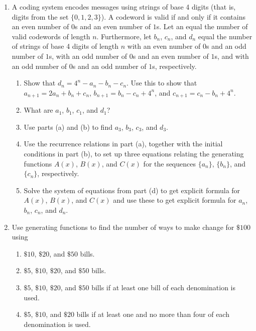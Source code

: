 \documentclass{../../cls/sig-alternate-05-2015}
\begin{document}
\begin{enumerate}
	\item A coding system encodes messages using strings of
	base 4 digits (that is, digits from the set $\{0, 1, 2, 3\}$). A codeword is valid if and only if it contains an even
	number of $0$s and an even number of $1$s. Let an equal the number of valid codewords of length $n$. Furthermore, let $b_n$, $c_n$, and $d_n$ equal the number of strings of base 4 digits of length $n$ with an even number of $0$s and an odd number of $1$s, with an odd number of $0$s and an even number of $1$s, and with an odd number of $0$s and an odd number of $1$s, respectively. \begin{enumerate}
		\item Show that $d_n = 4^n - a_n - b_n - c_n$. Use this to show that $a_{n+1} = 2a_n + b_n + c_n$, $b_{n+1} = b_n - c_n + 4^n$, and $c_{n+1} = c_n - b_n + 4^n$.
		\item What are $a_1$, $b_1$, $c_1$, and $d_1$?
		\item Use parts (a) and (b) to find $a_3$, $b_3$, $c_3$, and $d_3$.
		\item Use the recurrence relations in part (a), together with the initial conditions in part (b), to set up three equations relating the generating functions $A(x)$, $B(x)$, and $C(x)$ for the sequences $\{a_n\}$, $\{b_n\}$, and $\{c_n\}$, respectively.
		\item Solve the system of equations from part (d) to get explicit formula for $A(x)$, $B(x)$, and $C(x)$ and use these to get explicit formula for $a_n$, $b_n$, $c_n$, and $d_n$.
		

	\end{enumerate}
	
	\item Use generating functions to find the number of ways to
	make change for $\$100$ using
	\begin{enumerate}
		\item $\$10$, $\$20$, and $\$50$ bills.
		\item $\$5$, $\$10$, $\$20$, and $\$50$ bills.
		\item $\$5$, $\$10$, $\$20$, and $\$50$ bills if at least one bill of each
		denomination is used.
		\item $\$5$, $\$10$, and $\$20$ bills if at least one and no more than
		four of each denomination is used.
	\end{enumerate}
\end{enumerate}

\nocite{*}

 
\end{document}

